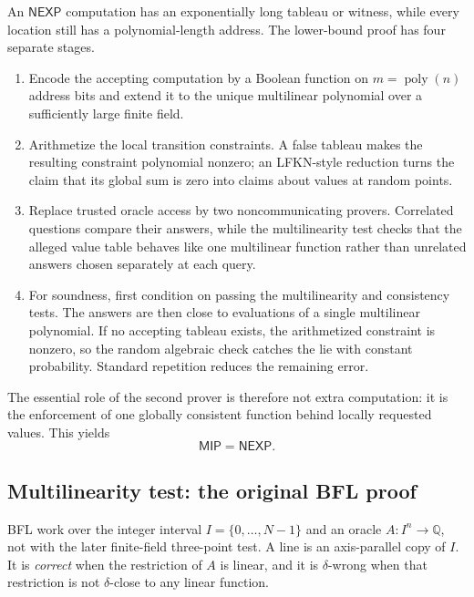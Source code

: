 \documentclass[10pt]{article}
\newcommand{\MIP}{\mathsf{MIP}}
\newcommand{\NEXP}{\mathsf{NEXP}}
\begin{document}
An $\NEXP$ computation has an exponentially long tableau or witness, while every
location still has a polynomial-length address.  The lower-bound proof has four
separate stages.
\begin{enumerate}
\item Encode the accepting computation by a Boolean function on
      $m=\operatorname{poly}(n)$ address bits and extend it to the unique
      multilinear polynomial over a sufficiently large finite field.
\item Arithmetize the local transition constraints.  A false tableau makes the
      resulting constraint polynomial nonzero; an LFKN-style reduction turns the
      claim that its global sum is zero into claims about values at random points.
\item Replace trusted oracle access by two noncommunicating provers.  Correlated
      questions compare their answers, while the multilinearity test checks that
      the alleged value table behaves like one multilinear function rather than
      unrelated answers chosen separately at each query.
\item For soundness, first condition on passing the multilinearity and consistency
      tests.  The answers are then close to evaluations of a single multilinear
      polynomial.  If no accepting tableau exists, the arithmetized constraint is
      nonzero, so the random algebraic check catches the lie with constant
      probability.  Standard repetition reduces the remaining error.
\end{enumerate}
The essential role of the second prover is therefore not extra computation: it is
the enforcement of one globally consistent function behind locally requested
values.  This yields
\[
 \boxed{\MIP=\NEXP.}
\]

\subsection{Multilinearity test: the original BFL proof}

BFL work over the integer interval $I=\{0,\ldots,N-1\}$ and an oracle
$A:I^n\to\mathbb Q$, not with the later finite-field three-point test.  A line
is an axis-parallel copy of $I$.  It is \emph{correct} when the restriction of
$A$ is linear, and it is $\delta$-wrong when that restriction is not
$\delta$-close to any linear function.
\end{document}
